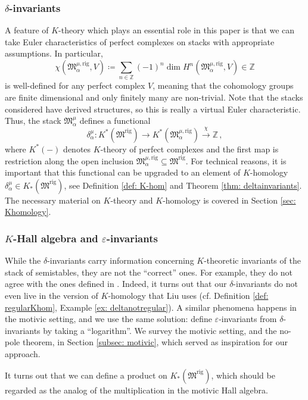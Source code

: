 \documentclass[12pt]{amsart}
\theoremstyle{definition}
\newcommand{\BZ}{{\mathbb{Z}}}
\newcommand{\1}{\mathbf 1}
\newcommand{\FM}{{\mathfrak{M}}}
\newcommand{\rig}{\mathrm{rig}}
\begin{document}
\subsubsection{$\delta$-invariants}
A feature of $K$-theory which plays an essential role in this paper is that we can take Euler characteristics of perfect complexes on stacks with appropriate assumptions. In particular,
\[\chi(\FM_\alpha^{\mu, \rig}, V)\coloneqq \sum_{n\in \BZ}(-1)^n \dim H^n(\FM_\alpha^{\mu, \rig}, V)\in \BZ\]
is well-defined for any perfect complex $V$, meaning that the cohomology groups are finite dimensional and only finitely many are non-trivial. Note that the stacks considered have derived structures, so this is really a virtual Euler characteristic. Thus, the stack $\FM_\alpha^\mu$ defines a functional 
\[\delta_\alpha^\mu\colon K^\ast(\FM^\rig)\rightarrow K^\ast(\FM_\alpha^{\mu, \rig})\xrightarrow{\chi} \BZ\,,\]
where $K^\ast(-)$ denotes $K$-theory of perfect complexes and the first map is restriction along the open inclusion $\FM_\alpha^{\mu, \rig}\subseteq \FM^\rig$. For technical reasons, it is important that this functional can be upgraded to an element of $K$-homology $\delta_\alpha^\mu\in K_\ast(\FM^\rig)$, see Definition \ref{def: K-hom} and Theorem \ref{thm: deltainvariants}. The necessary material on $K$-theory and $K$-homology is covered in Section \ref{sec: Khomology}.


\subsubsection{$K$-Hall algebra and $\varepsilon$-invariants}

While the $\delta$-invariants carry information concerning $K$-theoretic invariants of the stack of semistables, they are not the ``correct'' ones. For example, they do not agree with the ones defined in \cite{Liu}. Indeed, it turns out that our $\delta$-invariants do not even live in the version of $K$-homology that Liu uses (cf. Definition \ref{def: regularKhom}, Example \ref{ex: deltanotregular}). A similar phenomena happens in the motivic setting, and we use the same solution: define $\varepsilon$-invariants from $\delta$-invariants by taking a ``logarithm''. We survey the motivic setting, and the no-pole theorem, in Section \ref{subsec: motivic}, which served as inspiration for our approach. 

It turns out that we can define a product on $K_\ast(\FM^\rig)$, which should be regarded as the analog of the multiplication in the motivic Hall algebra. 
\end{document}
